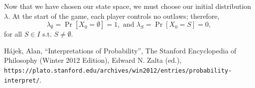 \documentclass{article}
\theoremstyle{definition}
\theoremstyle{plain}
\begin{document}
	Now that we have chosen our state space, we must choose our initial distribution $\lambda$. At the start of the game, each player controls no outlaws; therefore, \[\lambda_\emptyset = \Pr[X_0 = \emptyset] = 1, \text{ and }\lambda_S = \Pr[X_0 = S] = 0,\] for all $S \in I$ s.t. $S \neq \emptyset$.
	
	\begin{thebibliography}{9}
		H\'{a}jek, Alan, ``Interpretations of Probability'', The Stanford Encyclopedia of Philosophy (Winter 2012 Edition), Edward N. Zalta (ed.), \texttt{https://plato.stanford.edu/archives/win2012/entries/probability-interpret/}.
	\end{thebibliography}
\end{document}
